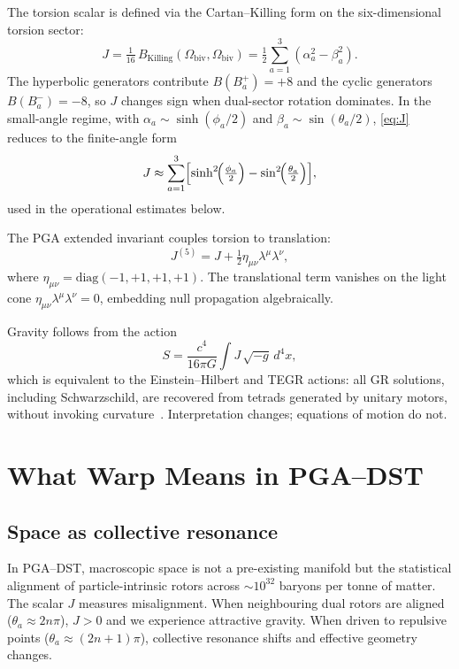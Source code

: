 \documentclass[dvipdfmx,a4paper]{article}
\theoremstyle{definition}
\begin{document}
The torsion scalar is defined via the Cartan--Killing form on the six-dimensional torsion sector:
\begin{equation}
J = \tfrac{1}{16}\,B_{\mathrm{Killing}}(\Omega_{\mathrm{biv}},\Omega_{\mathrm{biv}})
= \tfrac{1}{2}\sum_{a=1}^{3}(\alpha_a^2 - \beta_a^2).
\label{eq:J}
\end{equation}
The hyperbolic generators contribute $B(B_a^{+})=+8$ and the cyclic generators $B(B_a^{-})=-8$, so $J$ changes sign when dual-sector rotation dominates. In the small-angle regime, with $\alpha_a\sim\sinh(\phi_a/2)$ and $\beta_a\sim\sin(\theta_a/2)$, \eqref{eq:J} reduces to the finite-angle form
\begin{equation}
J \approx \sum_{a=1}^{3}\Bigl[\sinh^2\!\Bigl(\tfrac{\phi_a}{2}\Bigr) - \sin^2\!\Bigl(\tfrac{\theta_a}{2}\Bigr)\Bigr],
\label{eq:J-finite}
\end{equation}
used in the operational estimates below.

The PGA extended invariant couples torsion to translation:
\begin{equation}
J^{(5)} = J + \tfrac{1}{2}\eta_{\mu\nu}\lambda^\mu\lambda^\nu,
\label{eq:J5}
\end{equation}
where $\eta_{\mu\nu}=\mathrm{diag}(-1,+1,+1,+1)$. The translational term vanishes on the light cone $\eta_{\mu\nu}\lambda^\mu\lambda^\nu=0$, embedding null propagation algebraically.

Gravity follows from the action
\begin{equation}
S = \frac{c^4}{16\pi G}\int J\,\sqrt{-g}\,d^4x,
\label{eq:action}
\end{equation}
which is equivalent to the Einstein--Hilbert and TEGR actions: all GR solutions, including Schwarzschild, are recovered from tetrads generated by unitary motors, without invoking curvature~\cite{pga2025,tegr}. Interpretation changes; equations of motion do not.

\section{What Warp Means in PGA--DST}
\label{sec:warp-ontology}

\subsection{Space as collective resonance}

In PGA--DST, macroscopic space is not a pre-existing manifold but the statistical alignment of particle-intrinsic rotors across $\sim 10^{32}$ baryons per tonne of matter. The scalar $J$ measures misalignment. When neighbouring dual rotors are aligned ($\theta_a\approx 2n\pi$), $J>0$ and we experience attractive gravity. When driven to repulsive points ($\theta_a\approx(2n+1)\pi$), collective resonance shifts and effective geometry changes.
\end{document}
